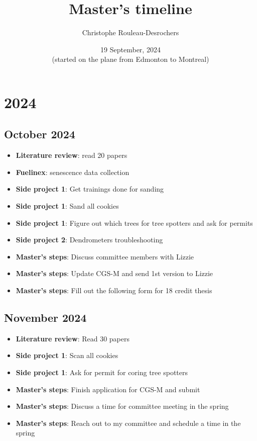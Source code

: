\documentclass{article}
\title{Master's timeline}
\author[]{Christophe Rouleau-Desrochers}
\date{19 September, 2024 \\ (started on the plane from Edmonton to Montreal)}
\begin{document}
\maketitle

\tableofcontents
\newpage


\section*{\centering \Large 2024}

\subsection*{October 2024}
\begin {itemize}
	\item \textbf{Literature review}: read 20 papers
	\item \textbf{Fuelinex}: senescence data collection
	\item \textbf{Side project 1}: Get trainings done for sanding 
	\item \textbf{Side project 1}: Sand all cookies
	\item \textbf{Side project 1}: Figure out which trees for tree spotters and ask for permits
	\item \textbf{Side project 2}: Dendrometers troubleshooting
	\item \textbf{Master's steps}: Discuss committee members with Lizzie 
	\item \textbf{Master's steps}: Update CGS-M and send 1st version to Lizzie
	\item \textbf{Master's steps}: Fill out the following form for 18 credit thesis %
\end {itemize}


\subsection*{November 2024}
\begin{itemize}
    \item \textbf{Literature review}: Read 30 papers
    \item \textbf{Side project 1}: Scan all cookies
    \item \textbf{Side project 1}: Ask for permit for coring tree spotters
    \item \textbf{Master's steps}: Finish application for CGS-M and submit
    \item \textbf{Master's steps}: Discuss a time for committee meeting in the spring
    \item \textbf{Master's steps}: Reach out to my committee and schedule a time in the spring
\end{itemize}
\end{document}
